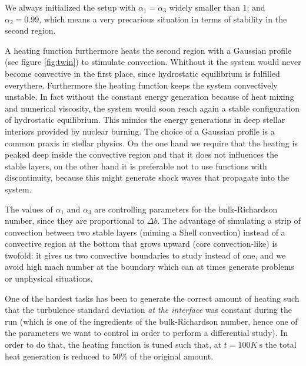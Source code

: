 We always initialized the setup with $\alpha_{1} = \alpha_{3}$ widely smaller than $1$; and $\alpha_{2}=0.99$, which means a very precarious situation in terms of stability in the second region. 

A heating function furthermore heats the second region with a Gaussian profile (see figure \ref{fig:twin}) to stimulate convection. Whithout it the system would never become convective in the first place, since hydrostatic equilibrium is fulfilled everythere. Furthermore the heating function keeps the system convectively unstable. In fact without the constant energy generation because of heat mixing and numerical viscosity, the system would soon reach again a stable configuration of hydrostatic equilibrium. This mimics the energy generations in deep stellar interiors provided by nuclear burning. The choice of a Gaussian profile is a common praxis in stellar physics. On the one hand we require that the heating is peaked deep inside the convective region and that it does not influences the stable layers, on the other hand it is preferable not to use functions with discontinuity, because this might generate shock waves that propagate into the system.

The values of $\alpha_{1}$ and $\alpha_{3}$ are controlling parameters for the bulk-Richardson number, since they are proportional to $\Delta b$. The advantage of simulating a strip of convection between two stable layers (miming a Shell convection) instead of a convective region at the bottom that grows upward (core convection-like) is twofold: it gives us two convective boundaries to study instead of one, and we avoid high mach number at the boundary which can at times generate problems or unphysical situations. 

One of the hardest tasks has been to generate the correct amount of heating such that the turbulence standard deviation \textit{at the interface} was constant during the run (which is one of the ingredients of the bulk-Richardson number, hence one of the parameters we want to control in order to perform a differential study). In order to do that, the heating function is tuned such that, at $t=100K \ \mathrm{s}$ the total heat generation is reduced to $50 \%$ of the original amount.

